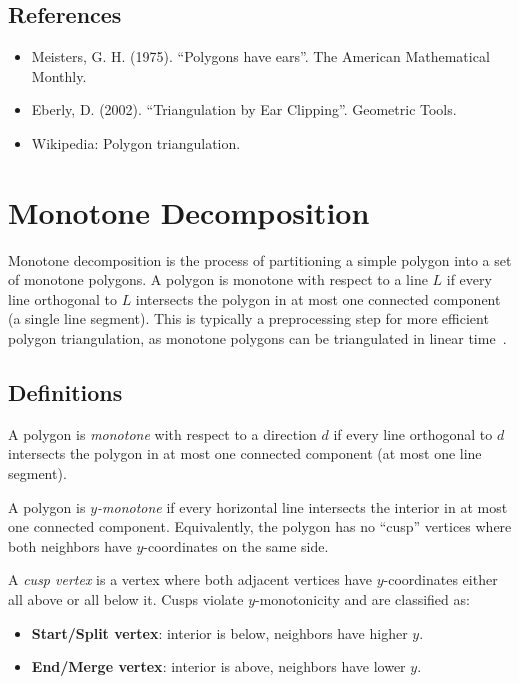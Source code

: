 \subsection{References}

\begin{itemize}
\item Meisters, G. H. (1975). ``Polygons have ears''. The American Mathematical Monthly.
\item Eberly, D. (2002). ``Triangulation by Ear Clipping''. Geometric Tools.
\item Wikipedia: Polygon triangulation.
\end{itemize}


\section{Monotone Decomposition}
\label{sec:monotone_decomposition}

Monotone decomposition is the process of partitioning a simple polygon into a set of monotone polygons. A polygon is monotone with respect to a line $L$ if every line orthogonal to $L$ intersects the polygon in at most one connected component (a single line segment). This is typically a preprocessing step for more efficient polygon triangulation, as monotone polygons can be triangulated in linear time~\cite{preparata1985}.

\subsection{Definitions}

\begin{definition}\label{def:monotone_polygon}
A polygon is \emph{monotone} with respect to a direction $d$ if every line orthogonal to $d$ intersects the polygon in at most one connected component (at most one line segment).
\end{definition}

\begin{definition}\label{def:y_monotone}
A polygon is \emph{$y$-monotone} if every horizontal line intersects the interior in at most one connected component. Equivalently, the polygon has no ``cusp'' vertices where both neighbors have $y$-coordinates on the same side.
\end{definition}

\begin{definition}\label{def:cusp_vertex}
A \emph{cusp vertex} is a vertex where both adjacent vertices have $y$-coordinates either all above or all below it. Cusps violate $y$-monotonicity and are classified as:
\begin{itemize}
\item \textbf{Start/Split vertex}: interior is below, neighbors have higher $y$.
\item \textbf{End/Merge vertex}: interior is above, neighbors have lower $y$.
\end{itemize}
\end{definition}

